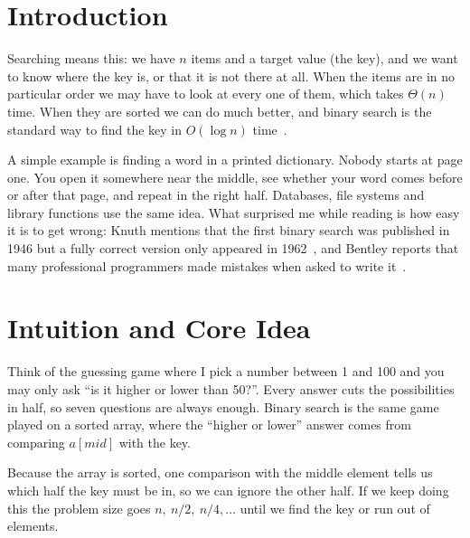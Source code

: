 \documentclass[11pt,a4paper]{article}
\newif\ifshowguidance
\newcommand{\guidance}[1]{\ifshowguidance\begin{guidancebox}#1\end{guidancebox}\fi}
\begin{document}
\tableofcontents
\newpage

\section{Introduction}
\guidance{State the problem, where it sits in the course, and one real-world example.}

Searching means this: we have $n$ items and a target value (the key), and we want
to know where the key is, or that it is not there at all. When the items are in no
particular order we may have to look at every one of them, which takes $\Theta(n)$
time. When they are sorted we can do much better, and binary search is the
standard way to find the key in $O(\log n)$ time~\cite{cormen2022,knuth1998}.

A simple example is finding a word in a printed dictionary. Nobody starts at page
one. You open it somewhere near the middle, see whether your word comes before or
after that page, and repeat in the right half. Databases, file systems and
library functions use the same idea. What surprised me while reading is how easy
it is to get wrong: Knuth mentions that the first binary search was published in
1946 but a fully correct version only appeared in 1962~\cite{knuth1998}, and
Bentley reports that many professional programmers made mistakes when asked to
write it~\cite{bentley2000}.

\section{Intuition and Core Idea}
\guidance{Plain-words explanation with a diagram.}

Think of the guessing game where I pick a number between 1 and 100 and you may only
ask ``is it higher or lower than 50?''. Every answer cuts the possibilities in
half, so seven questions are always enough. Binary search is the same game played
on a sorted array, where the ``higher or lower'' answer comes from comparing
$a[\mathit{mid}]$ with the key.

\begin{keyidea}
Because the array is sorted, one comparison with the middle element tells us
which half the key must be in, so we can ignore the other half. If we keep doing
this the problem size goes $n,\ n/2,\ n/4,\dots$ until we find the key or run out
of elements.
\end{keyidea}
\end{document}
